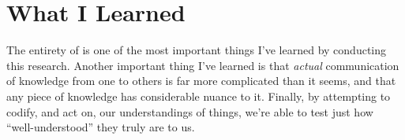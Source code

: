 \section{What I Learned}
\label{chap:conclusion:what-i-learned}

The entirety of  is one of the most important things I've
learned by conducting this research. Another important thing I've learned is
that \textit{actual} communication of knowledge from one to others is far more
complicated than it seems, and that any piece of knowledge has considerable
nuance to it. Finally, by attempting to codify, and act on, our understandings
of things, we're able to test just how ``well-understood''
\cite{well-understood} they truly are to us.
